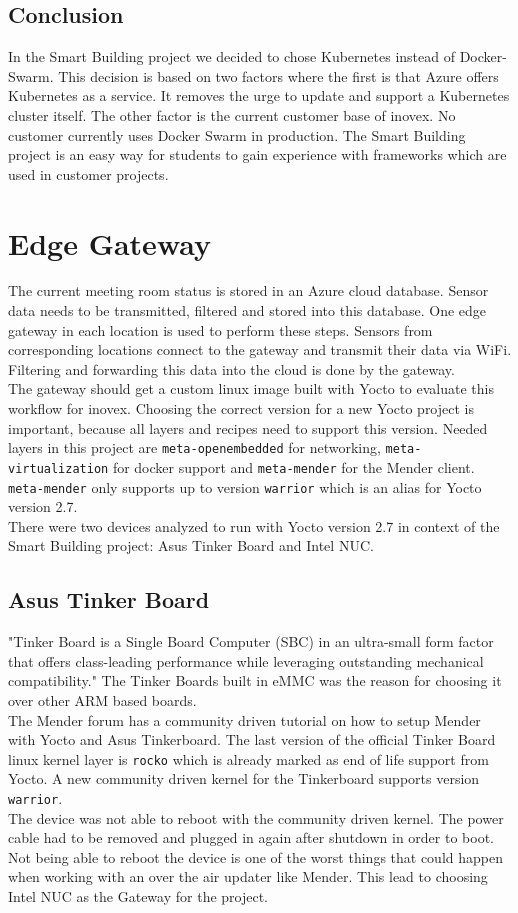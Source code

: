 \subsection{Conclusion}
In the Smart Building project we decided to chose Kubernetes instead of Docker-Swarm. This decision is based on two factors where the first is that Azure offers Kubernetes as a service. It removes the urge to update and support a Kubernetes cluster itself. The other factor is the current customer base of inovex. No customer currently uses Docker Swarm in production. The Smart Building project is an easy way for students to gain experience with frameworks which are used in customer projects.

\section{Edge Gateway}
The current meeting room status is stored in an Azure cloud database. Sensor data needs to be transmitted, filtered and stored into this database. One edge gateway in each location is used to perform these steps. Sensors from corresponding locations connect to the gateway and transmit their data via WiFi. Filtering and forwarding this data into the cloud is done by the gateway.\\
The gateway should get a custom linux image built with Yocto to evaluate this workflow for inovex. Choosing the correct version for a new Yocto project is important, because all layers and recipes need to support this version. Needed layers in this project are \verb|meta-openembedded| for networking, \verb|meta-virtualization| for docker support and \verb|meta-mender| for the Mender client. \verb|meta-mender| only supports up to version \verb|warrior| which is an alias for Yocto version 2.7.\\
There were two devices analyzed to run with Yocto version 2.7 in context of the Smart Building project: Asus Tinker Board and Intel NUC.

\subsection{Asus Tinker Board}
"Tinker Board is a Single Board Computer (SBC) in an ultra-small form factor that offers class-leading performance while leveraging outstanding mechanical compatibility."\cite{asus-tinkerboard} The Tinker Boards built in eMMC was the reason for choosing it over other ARM based boards.\\
The Mender forum has a community driven tutorial on how to setup Mender with Yocto and Asus Tinkerboard.\cite{asus-mender-yocto} The last version of the official Tinker Board linux kernel layer is \verb|rocko| which is already marked as end of life support from Yocto. A new community driven kernel for the Tinkerboard supports version \verb|warrior|. \cite{github-meta-rockchip} \\
The device was not able to reboot with the community driven kernel. The power cable had to be removed and plugged in again after shutdown in order to boot. Not being able to reboot the device is one of the worst things that could happen when working with an over the air updater like Mender. This lead to choosing Intel NUC as the Gateway for the project.

